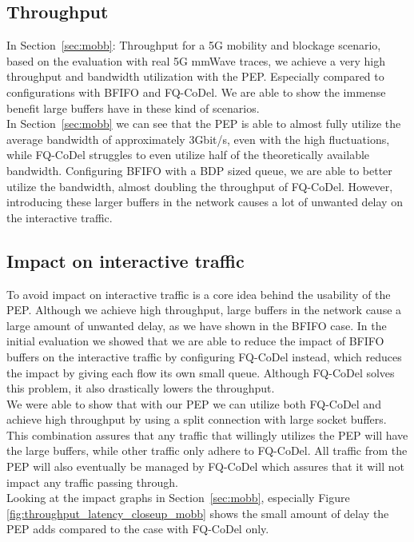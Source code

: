 \documentclass[a4paper,english, 12pt]{report}
\begin{document}
\subsection{Throughput}
In Section~\ref{sec:mobb}: Throughput for a 5G mobility and blockage scenario, based on the evaluation with real 5G mmWave traces, we achieve a very high throughput and bandwidth utilization with the PEP. Especially compared to configurations with BFIFO and FQ-CoDel. We are able to show the immense benefit large buffers have in these kind of scenarios.\\

In Section~\ref{sec:mobb} we can see that the PEP is able to almost fully utilize the average bandwidth of approximately 3Gbit/s, even with the high fluctuations, while FQ-CoDel struggles to even utilize half of the theoretically available bandwidth. Configuring BFIFO with a BDP sized queue, we are able to better utilize the bandwidth, almost doubling the throughput of FQ-CoDel. However, introducing these larger buffers in the network causes a lot of unwanted delay on the interactive traffic.

\subsection{Impact on interactive traffic}
To avoid impact on interactive traffic is a core idea behind the usability of the PEP. Although we achieve high throughput, large buffers in the network cause a large amount of unwanted delay, as we have shown in the BFIFO case. In the initial evaluation we showed that we are able to reduce the impact of BFIFO buffers on the interactive traffic by configuring FQ-CoDel instead, which reduces the impact by giving each flow its own small queue. Although FQ-CoDel solves this problem, it also drastically lowers the throughput.\\

We were able to show that with our PEP we can utilize both FQ-CoDel and achieve high throughput by using a split connection with large socket buffers. This combination assures that any traffic that willingly utilizes the PEP will have the large buffers, while other traffic only adhere to FQ-CoDel. All traffic from the PEP will also eventually be managed by FQ-CoDel which assures that it will not impact any traffic passing through.\\

Looking at the impact graphs in Section~\ref{sec:mobb}, especially Figure \ref{fig:throughput_latency_closeup_mobb} shows the small amount of delay the PEP adds compared to the case with FQ-CoDel only.
\end{document}
